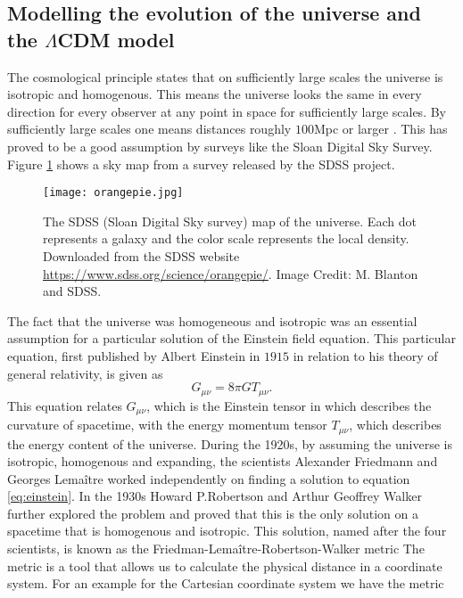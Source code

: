 \subsection{Modelling the evolution of the universe and the $\Lambda$CDM model}
The cosmological principle states that on sufficiently
large scales the universe is isotropic and homogenous. This means the universe
looks the same in every direction for every observer at any point in space for
sufficiently large scales. By sufficiently large scales one means
distances roughly $100$Mpc or larger \cite[p.~12]{ryden2017introduction}. This has proved to be a good
assumption by surveys like the Sloan Digital Sky Survey\cite{sloanhomogenous}. Figure \ref{fig:sdssmap} shows a sky map from a survey released by the SDSS project.\\
\begin{figure}[htbp]\label{fig:sdssmap}
    \texttt{[image: orangepie.jpg]}
    \caption{The SDSS (Sloan Digital Sky survey) map of the universe. Each dot represents a galaxy and the color scale represents the local density. Downloaded from the SDSS website \url{https://www.sdss.org/science/orangepie/}. Image Credit: M. Blanton and SDSS.}
\end{figure}
The fact that the universe was homogeneous and isotropic was an essential assumption
for a particular solution of the Einstein field equation. 
This particular equation, first published by Albert Einstein in $1915$ \cite{Einstein1915} in relation to his theory of general relativity, is given as
\begin{equation}\label{eq:einstein}
    G_{\mu\nu}=8\pi GT_{\mu\nu}.
\end{equation}
This equation relates $G_{\mu\nu}$, which is the Einstein tensor in which describes the curvature of spacetime, with the energy momentum tensor
$T_{\mu\nu}$, which describes the energy content of the universe. During the 1920s, by assuming the universe is isotropic, homogenous and expanding, the scientists Alexander Friedmann and Georges Lemaître worked independently on finding a solution to equation \ref{eq:einstein}. In the 1930s Howard P.Robertson and Arthur Geoffrey Walker further explored the problem and proved that this is the only solution on a spacetime that is homogenous and isotropic.
This solution, named after the four scientists, is known as the Friedman-Lemaître-Robertson-Walker metric
The metric is a tool that allows us to calculate the physical distance in a coordinate system.
For an example for the Cartesian coordinate system we have the metric 
